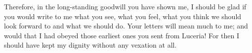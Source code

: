  Therefore, in the long-standing goodwill you have shown me, I should be glad if you would write to me what you see, what you feel, what you think we should look forward to and what we should do. Your letters will mean much to me; and would that I had obeyed those earliest ones you sent from Luceria! For then I should have kept my dignity without any vexation at all.
